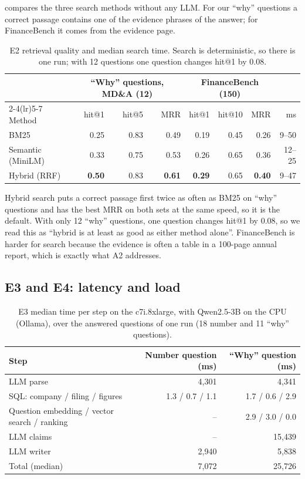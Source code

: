  compares the three search methods without any LLM. For our ``why'' questions a correct
passage contains one of the evidence phrases of the answer; for FinanceBench it comes from the evidence
page.

\begin{table}[ht]
\centering\small
\begin{tabular}{lrrrrrrr}
\toprule
 & \multicolumn{3}{c}{``Why'' questions, MD\&A (12)} & \multicolumn{3}{c}{FinanceBench (150)} & \\
\cmidrule(lr){2-4}\cmidrule(lr){5-7}
Method & hit@1 & hit@5 & MRR & hit@1 & hit@10 & MRR & ms \\
\midrule
BM25            & 0.25 & 0.83 & 0.49 & 0.19 & 0.45 & 0.26 & 9--50 \\
Semantic (MiniLM) & 0.33 & 0.75 & 0.53 & 0.26 & 0.65 & 0.36 & 12--25 \\
Hybrid (RRF)    & \textbf{0.50} & 0.83 & \textbf{0.61} & \textbf{0.29} & 0.65 & \textbf{0.40} & 9--47 \\
\bottomrule
\end{tabular}
\caption{E2 retrieval quality and median search time. Search is deterministic, so there is one run;
with 12 questions one question changes hit@1 by 0.08.}
\label{tab:e2}
\end{table}

Hybrid search puts a correct passage first twice as often as BM25 on ``why'' questions and has the best
MRR on both sets at the same speed, so it is the default. With only 12 ``why'' questions, one question
changes hit@1 by 0.08, so we read this as ``hybrid is at least as good as either method alone''.
FinanceBench is harder for search because the evidence is often a table in a 100-page annual report,
which is exactly what A2 addresses.

\subsection{E3 and E4: latency and load}
\label{sec:e4}

\begin{table}[ht]
\centering\small
\begin{tabular}{lrr}
\toprule
Step & Number question (ms) & ``Why'' question (ms) \\
\midrule
LLM parse & 4,301 & 4,341 \\
SQL: company / filing / figures & 1.3 / 0.7 / 1.1 & 1.7 / 0.6 / 2.9 \\
Question embedding / vector search / ranking & -- & 2.9 / 3.0 / 0.0 \\
LLM claims & -- & 15,439 \\
LLM writer & 2,940 & 5,838 \\
\midrule
Total (median) & 7,072 & 25,726 \\
\bottomrule
\end{tabular}
\caption{E3 median time per step on the c7i.8xlarge, with Qwen2.5-3B on the CPU (Ollama), over the
answered questions of one run (18 number and 11 ``why'' questions).}
\label{tab:e3}
\end{table}

